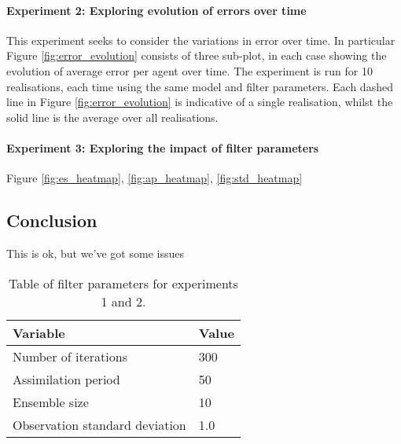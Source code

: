 \paragraph{Experiment 2: Exploring evolution of errors over time}

This experiment seeks to consider the variations in error over time.
In particular Figure \ref{fig:error_evolution} consists of three sub-plot, in
each case showing the evolution of average error per agent over time.
The experiment is run for 10 realisations, each time using the same model and
filter parameters.
Each dashed line in Figure \ref{fig:error_evolution} is indicative of a single
realisation, whilst the solid line is the average over all realisations.


\paragraph{Experiment 3: Exploring the impact of filter parameters}

Figure \ref{fig:es_heatmap}, \ref{fig:ap_heatmap}, \ref{fig:std_heatmap}

\subsection{Conclusion}\label{sub:research:conclusion}

This is ok, but we've got some issues

\newpage
\begin{table}[h]
    \centering
    \begin{tabular}{@{}ll@{}}
        \toprule
        Variable                       & Value                         \\ \midrule
        Number of iterations           & 300                           \\
        Assimilation period            & 50                            \\
        Ensemble size                  & 10                            \\
        Observation standard deviation & 1.0                           \\ \bottomrule
    \end{tabular}
    \caption{Table of filter parameters for experiments
    1 and 2.}\label{tab:filter_params_12}
\end{table}

